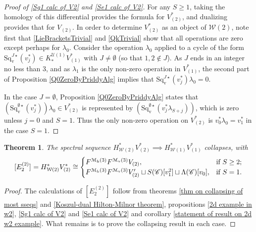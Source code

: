 \documentclass[11pt]{amsart} \renewcommand{\baselinestretch}{1.4}
\theoremstyle{plain}
\newtheorem{thm}{Theorem}[section]
\theoremstyle{definition}
\newcommand{\scrC}{\mathscr{C}}
\newcommand{\calU}{\mathcal{U}}
\newcommand{\calw}{\mathcal{W}}
\newcommand{\calmv}{\mathcal{M}\dver}
\newcommand{\calmh}{\mathcal{M}\dhor}
\newcommand{\CommOperad}{{\scrC}}
\newcommand{\E}[5]{[E^{#1}_{#2}#3]^{#4}_{#5}}
\newcommand{\dver}{_\mathrm{v}}
\newcommand{\dhor}{_\mathrm{h}}
\newcommand{\Sqvstar}[1]{\mathrm{Sq}\dver^{#1\star}}
\begin{document}
\begin{Calculations of HWn for n nonzero}
\begin{proof}[Proof of \ref{Sg1 calc of V2} and \ref{Se1 calc of V2}]
For any $S\geq1$, taking the homology of this differential provides the formula for $V^*_{(2)}$, and dualizing provides that for $V_{(2)}$.
In order to determine $V^*_{(2)}$ as an object of $\calw(2)$, note first that \ref{LieBracketsTrivial} and \ref{QkTrivial} show that all operations are zero except perhaps for $\lambda_0$. %
Consider the operation $\lambda_0$ applied to a cycle of the form $\Sqvstar{J}(v_{j}^*)\in K_{*}^{\calU(1)}V^*_{(1)}$ with $J\neq\emptyset$ (so that $1,2\notin J$). As $J$ ends in an integer no less than 3, and as $\lambda_1$ is the only non-zero operation in $V^*_{(1)}$, the second part of Proposition \ref{Q0ZeroByPriddyAlg} implies that $\Sqvstar{J}(v_{j}^*)\lambda_0=0$.

In the case $J=\emptyset$, Proposition \ref{Q0ZeroByPriddyAlg} states that $(\Sqvstar{\emptyset}(v_{j}^*))\lambda_0\in V^*_{(2)}$ is represented by $(\Sqvstar{\emptyset}(v_{j}^*\lambda_{S+j}))$, which is zero unless $j=0$ and $S=1$. Thus the only non-zero operation on $V^*_{(2)}$ is $v_0^*\lambda_0=v_1^*$ in the case $S=1$.
\end{proof}
\begin{thm}
\label{W2 to W1 collapse}
The spectral sequence $H^*_{\calw(2)}V^*_{(2)}\implies H^*_{\calw(1)}V^*_{(1)}$ collapses, with
\[\E{(2)}{2}{}{}{}=H^*_{\calw(2)}V^*_{(2)}\cong\begin{cases}
F^{\calmh(3)}F^{\calmv(3)}V_{(2)},&\textup{if }S\geq2;\\
F^{\calmh(3)}F^{\calmv(3)}V'_{(2)}\sqcup S(\CommOperad) [v_1^{2}]\sqcup \Lambda(\CommOperad)[v_0],&\textup{if }S=1.
\end{cases}
\]
\end{thm}
\begin{proof}
The calculations of $\E{(2)}{2}{}{}{}$ follow from  theorems \ref{thm on collapsing of most sseqs} and \ref{Koszul-dual Hilton-Milnor theorem}, propositions \ref{2d example in w2}, \ref{Sg1 calc of V2} and \ref{Se1 calc of V2}  and corollary \ref{statement of result on 2d w2 example}. What remains is to prove the collapsing result in each case.


\end{proof}
\end{Calculations of HWn for n nonzero}
\end{document}
